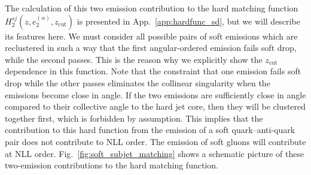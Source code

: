 \documentclass[a4paper,11pt]{article}
\newcommand{\ecf}[2]{e_{#1}^{(#2)}}
\def\zcut{z_{\text{cut}}}
\DeclareRobustCommand{\App}[1]{App.~\ref{#1}}
\DeclareRobustCommand{\Fig}[1]{Fig.~\ref{#1}}
\begin{document}
The calculation of this two emission contribution to the hard matching function $H_2^{sj}(z,\ecf{2}{\alpha},\zcut)$ is presented in \App{app:hardfunc_sd}, but we will describe its features here.   We must consider all possible pairs of soft emissions which are reclustered in such a way that the first angular-ordered emission fails soft drop, while the second passes.  This is the reason why we explicitly show the $\zcut$ dependence in this function.  Note that the constraint that one emission fails soft drop while the other passes eliminates the collinear singularity when the emissions become close in angle.  If the two emissions are sufficiently close in angle compared to their collective angle to the hard jet core, then they will be clustered together first, which is forbidden by assumption.  This implies that the contribution to this hard function from the emission of a soft quark--anti-quark pair does not contribute to NLL order.  The emission of soft gluons will contribute at NLL order. \Fig{fig:soft_subjet_matching} shows a schematic picture of these two-emission contributions to the hard matching function.
\end{document}
